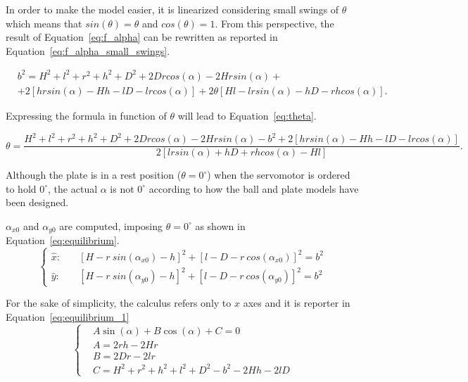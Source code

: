 In order to make the model easier, it is linearized considering small swings of
$\theta$ which means that $sin(\theta)=\theta$ and $cos(\theta)=1$.
From this perspective, the result of Equation~\ref{eq:f_alpha} can be rewritten
as reported in Equation~\ref{eq:f_alpha_small_swings}.

\begin{equation}
\begin{aligned}
& b^2 = H^2 + l^2 + r^2  + h^2 + D^2 + 2 D r cos(\alpha) - 2 H r sin(\alpha) +\\
& + 2 [ h r sin(\alpha) - H h - l D - l r cos(\alpha) ] + 2 \theta [ H l - l r sin(\alpha) - h D - r h cos(\alpha)].
\end{aligned}
\label{eq:f_alpha_small_swings}
\end{equation}

Expressing the formula in function of $\theta$ will lead to
Equation~\ref{eq:theta}.

\begin{equation}
\theta = \frac{H^2 + l^2 + r^2  + h^2 + D^2 + 2 D r cos(\alpha) - 2 H r sin(\alpha) - b^2 + 2 [ h r sin(\alpha) - H h -
l D - l r cos(\alpha) ]}{2 [ l r sin(\alpha) + h D + r h cos(\alpha) - H l]}.
\label{eq:theta}
\end{equation}

Although the plate is in a rest position ($\theta=0^{\circ}$) when the 
servomotor is ordered to hold $0^{\circ}$, the actual $\alpha$ is not
$0^{\circ}$ according to how the ball and plate models have been designed.

$\alpha_{x0}$ and $\alpha_{y0}$ are computed, imposing $\theta=0^{\circ}$ as
shown in Equation~\ref{eq:equilibrium}.
\begin{equation}
\left\{
\begin{aligned}
	\hat{x}: & \quad [H - r\ sin (\alpha_{x0}) - h]^2 + [l - D - r\ cos(\alpha_{x0})]^2 = b^2\\
	\hat{y}: & \quad [H - r\ sin (\alpha_{y0}) - h]^2 + [l - D - r\ cos(\alpha_{y0})]^2 = b^2
\end{aligned}
\right.
\label{eq:equilibrium}
\end{equation}

For the sake of simplicity, the calculus refers only to $x$ axes and it is
reporter in Equation~\ref{eq:equilibrium_1}
\begin{equation}
\left\{
\begin{aligned}
&	A \sin(\alpha) + B \cos(\alpha) + C = 0\\
&	A = 2rh-2Hr\\
&	B = 2Dr-2lr\\
&	C = H^2+r^2+h^2+l^2+D^2-b^2-2Hh-2lD
\end{aligned}
\right.
\label{eq:equilibrium_1}
\end{equation}

